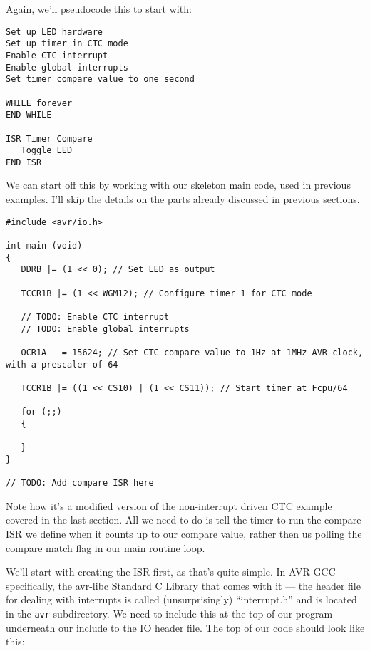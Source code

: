 \documentclass[a4paper,oneside]{book}
\begin{document}
Again, we'll pseudocode this to start with: 

\begin{center}
\begin{lstlisting}[keywordstyle=\color{black},commentstyle=\color{black}]
Set up LED hardware
Set up timer in CTC mode
Enable CTC interrupt
Enable global interrupts
Set timer compare value to one second

WHILE forever
END WHILE

ISR Timer Compare
   Toggle LED
END ISR 
\end{lstlisting}
\end{center}

We can start off this by working with our skeleton main code, used in previous examples. I'll skip the details on the parts already discussed in previous sections.

\begin{center}
\begin{lstlisting}
#include <avr/io.h>

int main (void)
{
   DDRB |= (1 << 0); // Set LED as output

   TCCR1B |= (1 << WGM12); // Configure timer 1 for CTC mode

   // TODO: Enable CTC interrupt
   // TODO: Enable global interrupts

   OCR1A   = 15624; // Set CTC compare value to 1Hz at 1MHz AVR clock, with a prescaler of 64

   TCCR1B |= ((1 << CS10) | (1 << CS11)); // Start timer at Fcpu/64

   for (;;)
   {

   }
}

// TODO: Add compare ISR here 
\end{lstlisting}
\end{center}

Note how it's a modified version of the non-interrupt driven CTC example covered in the last section. All we need to do is tell the timer to run the compare ISR we define when it counts up to our compare value, rather then us polling the compare match flag in our main routine loop.

We'll start with creating the ISR first, as that's quite simple. In AVR-GCC --- specifically, the avr-libc Standard C Library that comes with it --- the header file for dealing with interrupts is called (unsurprisingly) ``interrupt.h'' and is located in the \texttt{avr} subdirectory. We need to include this at the top of our program underneath our include to the IO header file. The top of our code should look like this:
\end{document}
